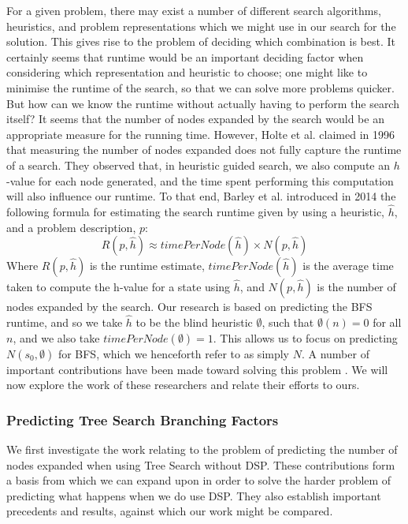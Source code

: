 \documentclass{article}
\begin{document}
For a given problem, there may exist a number of different search algorithms,
heuristics, and problem representations which we might use in our search for the solution.
This gives rise to the problem of deciding which combination is best.
It certainly seems that runtime would be an important deciding factor
when considering which representation and heuristic to choose;
one might like to minimise the runtime of the search, so that we can solve more problems quicker.
But how can we know the runtime without actually having to perform the search itself?
It seems that the number of nodes expanded by the search would be an appropriate measure
for the running time. However, Holte et al. claimed in 1996 \cite{holte1996hierarchical}
that measuring the number of nodes expanded does not fully capture the runtime of a search.
They observed that, in heuristic guided search, we also compute an \(h\)-value for each node generated,
and the time spent performing this computation will also influence our runtime.
To that end, Barley et al. introduced in 2014 \cite{barley2014overcoming} the following formula for estimating the search runtime
given by using a heuristic, \(\hat{h}\), and a problem description, \(p\):
\[R(p, \hat{h}) \approx timePerNode(\hat{h}) \times N(p,\hat{h}) \]
Where \(R(p, \hat{h})\) is the runtime estimate,
\(timePerNode(\hat{h})\) is the average time taken to compute the h-value for a state using \(\hat{h}\),
and \(N(p,\hat{h})\) is the number of nodes expanded by the search.
Our research is based on predicting the BFS runtime, and so we take \(\hat{h}\) to be the
blind heuristic \(\emptyset\), such that \(\emptyset(n) = 0\) for all \(n\),
and we also take \(timePerNode(\emptyset) = 1\). This allows us to focus on predicting \(N(s_0, \emptyset)\) for BFS,
which we henceforth refer to as simply \(N\).
A number of important contributions have been made toward solving this problem \cite{knuth1975estimating, purdom1978tree, chen1992heuristic, korf2001time, zahavi2010predicting, lelis2013predicting, lelis2014estimating}.
We will now explore the work of these researchers and relate their efforts to ours.

\subsubsection*{Predicting Tree Search Branching Factors}

We first investigate the work relating to the problem of predicting
the number of nodes expanded when using Tree Search without DSP.
These contributions form a basis from which we can
expand upon in order to solve the harder problem of predicting what
happens when we do use DSP. They also establish important precedents and results,
against which our work might be compared. \\
\end{document}
